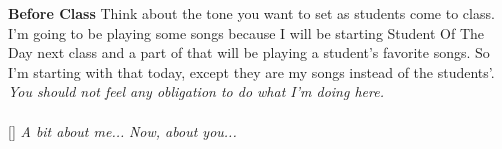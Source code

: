 \documentclass[10pt]{article}
\begin{document}
\pagestyle{otherpages}
\thispagestyle{firstpage}



{\bf Before Class} \mod Think about the tone you want to set as students come to class. I'm going to be playing some songs because I will be starting Student Of The Day next class and a part of that will be playing a student's favorite songs.  So I'm starting with that today, except they are my songs instead of the students'.  {\em You should not feel any obligation to do what I'm doing here.}
~\\
 \mod \\
 []{
 {\em A bit about me...}
 }{
{ \em Now, about you...}
 }
~\\ 
\end{document}
